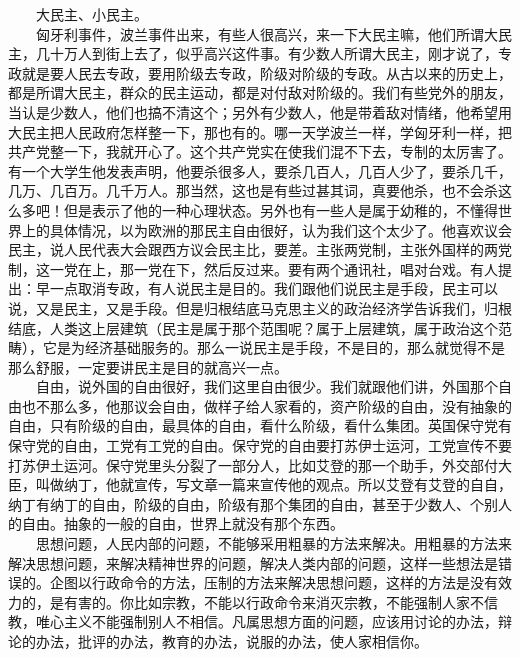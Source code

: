 \documentclass[cn,11pt,chinese]{elegantbook}
\begin{document}
　　大民主、小民主。\\
　　匈牙利事件，波兰事件出来，有些人很高兴，来一下大民主嘛，他们所谓大民主，几十万人到街上去了，似乎高兴这件事。有少数人所谓大民主，刚才说了，专政就是要人民去专政，要用阶级去专政，阶级对阶级的专政。从古以来的历史上，都是所谓大民主，群众的民主运动，都是对付敌对阶级的。我们有些党外的朋友，当认是少数人，他们也搞不清这个；另外有少数人，他是带着敌对情绪，他希望用大民主把人民政府怎样整一下，那也有的。哪一天学波兰一样，学匈牙利一样，把共产党整一下，我就开心了。这个共产党实在使我们混不下去，专制的太厉害了。有一个大学生他发表声明，他要杀很多人，要杀几百人，几百人少了，要杀几千，几万、几百万。几千万人。那当然，这也是有些过甚其词，真要他杀，也不会杀这么多吧！但是表示了他的一种心理状态。另外也有一些人是属于幼稚的，不懂得世界上的具体情况，以为欧洲的那民主自由很好，认为我们这个太少了。他喜欢议会民主，说人民代表大会跟西方议会民主比，要差。主张两党制，主张外国样的两党制，这一党在上，那一党在下，然后反过来。要有两个通讯社，唱对台戏。有人提出：早一点取消专政，有人说民主是目的。我们跟他们说民主是手段，民主可以说，又是民主，又是手段。但是归根结底马克思主义的政治经济学告诉我们，归根结底，人类这上层建筑（民主是属于那个范围呢？属于上层建筑，属于政治这个范畴），它是为经济基础服务的。那么一说民主是手段，不是目的，那么就觉得不是那么舒服，一定要讲民主是目的就高兴一点。\\
　　自由，说外国的自由很好，我们这里自由很少。我们就跟他们讲，外国那个自由也不那么多，他那议会自由，做样子给人家看的，资产阶级的自由，没有抽象的自由，只有阶级的自由，最具体的自由，看什么阶级，看什么集团。英国保守党有保守党的自由，工党有工党的自由。保守党的自由要打苏伊士运河，工党宣传不要打苏伊土运河。保守党里头分裂了一部分人，比如艾登的那一个助手，外交部付大臣，叫做纳丁，他就宣传，写文章一篇来宣传他的观点。所以艾登有艾登的自自，纳丁有纳丁的自由，阶级的自由，阶级有那个集团的自由，甚至于少数人、个别人的自由。抽象的一般的自由，世界上就没有那个东西。\\
　　思想问题，人民内部的问题，不能够采用粗暴的方法来解决。用粗暴的方法来解决思想问题，来解决精神世界的问题，解决人类内部的问题，这样一些想法是错误的。企图以行政命令的方法，压制的方法来解决思想问题，这样的方法是没有效力的，是有害的。你比如宗教，不能以行政命令来消灭宗教，不能强制人家不信教，唯心主义不能强制别人不相信。凡属思想方面的问题，应该用讨论的办法，辩论的办法，批评的办法，教育的办法，说服的办法，使人家相信你。\\
\end{document}
